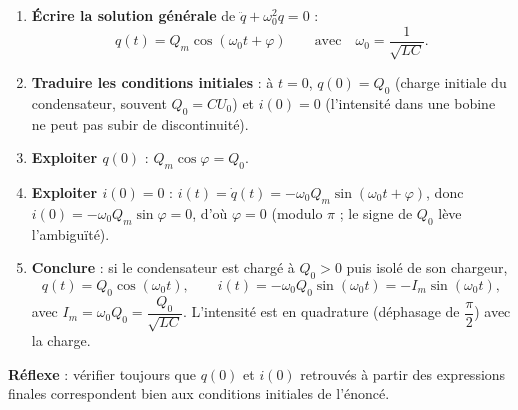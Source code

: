 \documentclass[11pt]{article}
\newcommand{\cle}[1]{{\popxbold\color{popdark}#1}}
\begin{document}
\begin{methode}
\begin{enumerate}
\item \textbf{Écrire la solution générale} de $\ddot{q} + \omega_0^2 q = 0$ :
\[ q(t) = Q_m\cos(\omega_0 t + \varphi) \qquad \text{avec} \quad \omega_0 = \frac{1}{\sqrt{LC}}. \]
\item \textbf{Traduire les conditions initiales} : à $t = 0$, $q(0) = Q_0$ (charge initiale du condensateur, souvent $Q_0 = CU_0$) et $i(0) = 0$ (l'intensité dans une bobine ne peut pas subir de discontinuité).
\item \textbf{Exploiter $q(0)$} : $Q_m\cos\varphi = Q_0$.
\item \textbf{Exploiter $i(0) = 0$} : $i(t) = \dot{q}(t) = -\omega_0 Q_m\sin(\omega_0 t + \varphi)$, donc $i(0) = -\omega_0 Q_m \sin\varphi = 0$, d'où $\varphi = 0$ (modulo $\pi$ ; le signe de $Q_0$ lève l'ambiguïté).
\item \textbf{Conclure} : si le condensateur est chargé à $Q_0 > 0$ puis isolé de son chargeur,
\[ q(t) = Q_0\cos(\omega_0 t), \qquad i(t) = -\omega_0 Q_0\sin(\omega_0 t) = -I_m\sin(\omega_0 t), \]
avec $I_m = \omega_0 Q_0 = \dfrac{Q_0}{\sqrt{LC}}$. L'intensité est en \cle{quadrature} (déphasage de $\dfrac{\pi}{2}$) avec la charge.
\end{enumerate}
\textbf{Réflexe} : vérifier toujours que $q(0)$ et $i(0)$ retrouvés à partir des expressions finales correspondent bien aux conditions initiales de l'énoncé.
\end{methode}
\end{document}
